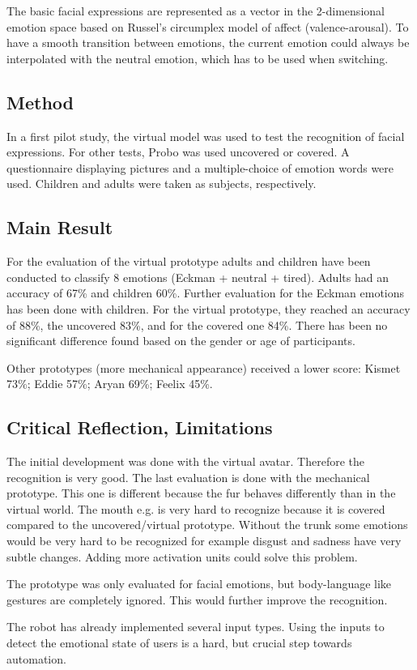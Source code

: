 \documentclass[smallheadings,english, DIV14]{scrartcl}
\begin{document}
The basic facial expressions are represented as a vector in the 2-dimensional emotion space based on Russel’s circumplex model of affect (valence-arousal). To have a smooth transition between emotions, the current emotion could always be interpolated with the neutral emotion, which has to be used when switching.

\subsection*{Method}

In a first pilot study, the virtual model was used to test the recognition of facial expressions. For other tests, Probo was used uncovered or covered. A questionnaire displaying pictures and a multiple-choice of emotion words were used. Children and adults were taken as subjects, respectively.

\subsection*{Main Result}

For the evaluation of the virtual prototype adults and children have been conducted to classify 8 emotions (Eckman + neutral + tired). Adults had an accuracy of 67\% and children 60\%. Further evaluation for the Eckman emotions has been done with children. For the virtual prototype, they reached an accuracy of 88\%, the uncovered 83\%, and for the covered one 84\%. There has been no significant difference found based on the gender or age of participants.

Other prototypes (more mechanical appearance) received a lower score: Kismet 73\%; Eddie 57\%; Aryan 69\%; Feelix 45\%. 

\subsection*{Critical Reflection, Limitations}

The initial development was done with the virtual avatar. Therefore the recognition is very good. The last evaluation is done with the mechanical prototype. This one is different because the fur behaves differently than in the virtual world. The mouth e.g. is very hard to recognize because it is covered compared to the uncovered/virtual prototype. Without the trunk some emotions would be very hard to be recognized for example disgust and sadness have very subtle changes. Adding more activation units could solve this problem.

The prototype was only evaluated for facial emotions, but body-language like gestures are completely ignored. This would further improve the recognition.

The robot has already implemented several input types. Using the inputs to detect the emotional state of users is a hard, but crucial step towards automation. 

\clearpage
\end{document}
